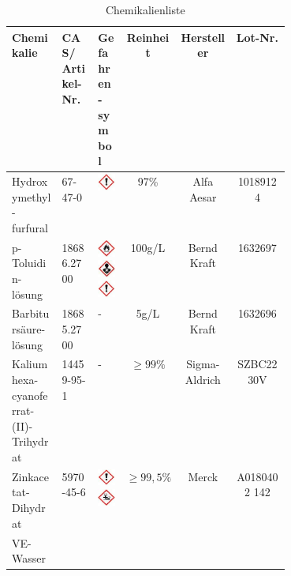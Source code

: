 \begin{table}[htbp]
	\centering
		\caption{Chemikalienliste}
		\begin{tabular}{L{0.18\linewidth}|C{0.13\linewidth}|C{0.1\linewidth}|c|c|c} 
			Chemikalie & CAS/ Artikel-Nr. & Gefahren-symbol & Reinheit & Hersteller & Lot-Nr.\\
			\hline
			Hydroxymethyl-furfural & 67-47-0 & \includegraphics{../Bilder/Ausrufezeichen.jpg} & 97\% & Alfa Aesar & 10189124\\
			\hline
			p-Toluidin-lösung & 18686.2700 & \includegraphics{../Bilder/Flamme.jpg} \includegraphics{../Bilder/Gesundheitsgefahr.jpg} \includegraphics{../Bilder/Ausrufezeichen.jpg} & 100g/L & Bernd Kraft & 1632697\\
			\hline
			Barbitursäure-lösung & 18685.2700 & - & 5g/L & Bernd Kraft & 1632696\\
			\hline
			Kaliumhexa-cyanoferrat-(II)-Trihydrat & 14459-95-1 & - & $\geq99\%$ & Sigma-Aldrich & SZBC2230V\\
			\hline
			Zinkacetat-Dihydrat & 5970-45-6 & \includegraphics{../Bilder/Ausrufezeichen.jpg} \includegraphics{../Bilder/Umwelt.jpg} & $\geq99,5\%$ & Merck & A0180402 142\\
			\hline
			VE-Wasser & & & & &
		\end{tabular}
	\label{tab:Chemikalienliste}
\end{table}

